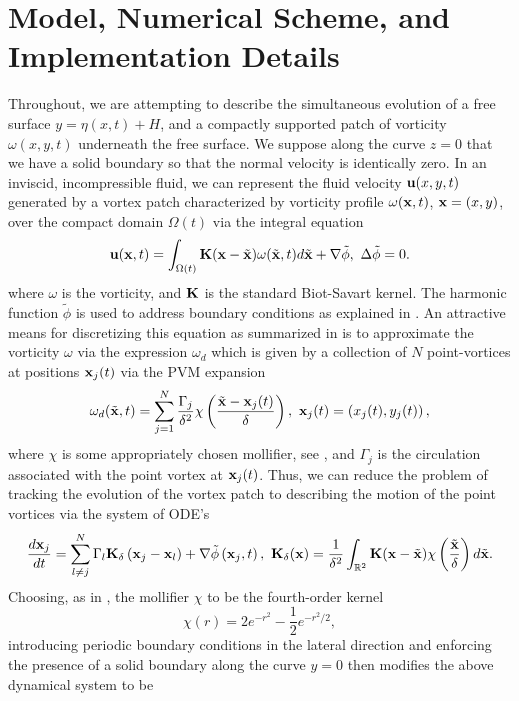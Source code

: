 \documentclass[a4paper,11pt]{article}
\begin{document}
\section{Model, Numerical Scheme, and Implementation Details}
Throughout, we are attempting to describe the simultaneous evolution of a free surface $y = \eta(x,t) + H$, and a compactly supported patch of vorticity $\omega(x,y,t)$ underneath the free surface.  We suppose along the curve $z=0$ that we have a solid boundary so that the normal velocity is identically zero.  In an inviscid, incompressible fluid, we can represent the fluid velocity ${\bf u}(x,y,t)$ generated by a vortex patch characterized by vorticity profile $\omega({\bf x},t)$, ${\bf x}=(x,y)$, over the compact domain $\Omega(t)$ via the integral equation
\[
{\bf u}({\bf x},t) = \int_{\Omega(t)} {\bf K}({\bf x}-\tilde{{\bf x}})\omega(\tilde{{\bf x}},t)d\tilde{{\bf x}} + \nabla \tilde{\phi}, ~ \Delta \tilde{\phi} = 0.
\]
where $\omega$ is the vorticity, and ${\bf K}$ is the standard Biot-Savart kernel.  The harmonic function $\tilde{\phi}$ is used to address boundary conditions as explained in \cite{saffman}.  An attractive means for discretizing this equation as summarized in \cite{cottet} is to approximate the vorticity $\omega$ via the expression $\omega_{d}$ which is given by a collection of $N$ point-vortices at positions ${\bf x}_{j}(t)$ via the PVM expansion
\begin{equation}
\omega_{d}(\tilde{{\bf x}},t) = \sum_{j=1}^{N} \frac{\Gamma_{j}}{\delta^{2}}\chi\left(\frac{\tilde{{\bf x}}-{\bf x}_{j}(t)}{\delta}\right), ~ {\bf x}_{j}(t) = \left(x_{j}(t),y_{j}(t) \right),
\label{discvort} 
\end{equation}
where $\chi$ is some appropriately chosen mollifier, see \cite{beale}, and $\Gamma_{j}$ is the circulation associated with the point vortex at ${\bf x}_{j}(t)$.  Thus, we can reduce the problem of tracking the evolution of the vortex patch to describing the motion of the point vortices via the system of ODE's
\[
\frac{d{\bf x}_{j}}{dt}  =  \sum_{l\neq j}^{N} \Gamma_{l} {\bf K}_{\delta}\left({\bf x}_{j}-{\bf x}_{l}\right) + \nabla \tilde{\phi}\left({\bf x}_{j},t\right), ~ {\bf K}_{\delta}({\bf x}) = \frac{1}{\delta^{2}}\int_{\mathbb{R}^{2}}{\bf K}({\bf x} - \tilde{\bf x})\chi \left(\frac{\tilde{{\bf x}}}{\delta} \right) d \tilde{{\bf x}}.
\]
Choosing, as in \cite{beale}, the mollifier $\chi$ to be the fourth-order kernel 
\[
\chi(r) = 2e^{-r^{2}} - \frac{1}{2}e^{-r^2/2}, 
\]
introducing periodic boundary conditions in the lateral direction and enforcing the presence of a solid boundary along the curve $y=0$ then modifies the above dynamical system to be 
\end{document}
